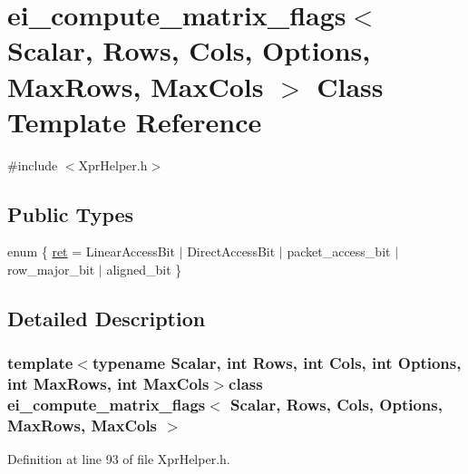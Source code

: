 \hypertarget{classei__compute__matrix__flags}{\section{ei\-\_\-compute\-\_\-matrix\-\_\-flags$<$ Scalar, Rows, Cols, Options, Max\-Rows, Max\-Cols $>$ Class Template Reference}
\label{classei__compute__matrix__flags}
}


{\ttfamily \#include $<$Xpr\-Helper.\-h$>$}

\subsection*{Public Types}
\begin{DoxyCompactItemize}
\item 
enum \{ \hyperlink{classei__compute__matrix__flags_a35e3b106e71e95760645093395a83c1aabf654660b4e3fc26955faf6a11f0c642}{ret} = Linear\-Access\-Bit $|$ Direct\-Access\-Bit $|$ packet\-\_\-access\-\_\-bit $|$ row\-\_\-major\-\_\-bit $|$ aligned\-\_\-bit
 \}
\end{DoxyCompactItemize}


\subsection{Detailed Description}
\subsubsection*{template$<$typename Scalar, int Rows, int Cols, int Options, int Max\-Rows, int Max\-Cols$>$class ei\-\_\-compute\-\_\-matrix\-\_\-flags$<$ Scalar, Rows, Cols, Options, Max\-Rows, Max\-Cols $>$}



Definition at line 93 of file Xpr\-Helper.\-h.



